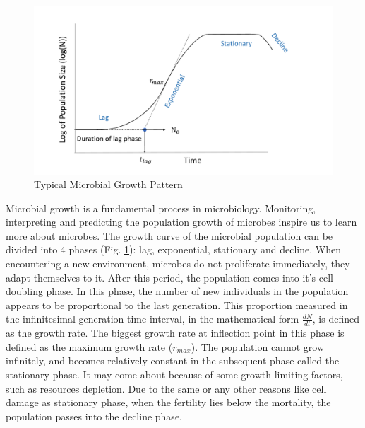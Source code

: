 \documentclass[a4paper]{article}
\begin{document}
\begin{figure}[ht!]
\centering
\includegraphics[width=0.95\linewidth]{Plot/typ_growth_pattern.pdf}
\caption{Typical Microbial Growth Pattern}\label{fig:typ_growth_pattern}
\end{figure}
Microbial growth is a fundamental process in microbiology. Monitoring, interpreting and predicting the population growth of microbes inspire us to learn more about microbes. The growth curve of the microbial population can be divided into 4 phases (Fig. \ref{fig:typ_growth_pattern}): lag, exponential, stationary and decline. When encountering a new environment, microbes do not proliferate immediately, they adapt themselves to it. After this period, the population comes into it's cell doubling phase. In this phase, the number of new individuals in the population appears to be proportional to the last generation. This proportion measured in the infinitesimal generation time interval, in the mathematical form $\frac{dN}{dt}$, is defined as the growth rate. The biggest growth rate at inflection point in this phase is defined as the maximum growth rate ($r_{max}$). The population cannot grow infinitely, and becomes relatively constant in the subsequent phase called the stationary phase. It may come about because of some growth-limiting factors, such as resources depletion. Due to the same or any other reasons like cell damage as stationary phase, when the fertility lies below the mortality, the population passes into the decline phase. \\
\end{document}
